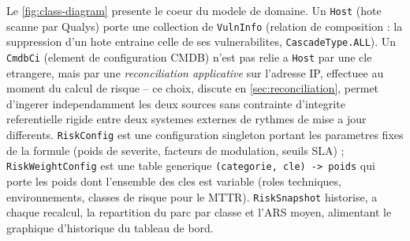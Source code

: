 Le \cref{fig:class-diagram} presente le coeur du modele de domaine. Un \texttt{Host}
(hote scanne par Qualys) porte une collection de \texttt{VulnInfo} (relation de
composition : la suppression d'un hote entraine celle de ses vulnerabilites,
\texttt{CascadeType.ALL}). Un \texttt{CmdbCi} (element de configuration CMDB) n'est
pas relie a \texttt{Host} par une cle etrangere, mais par une \emph{reconciliation
applicative} sur l'adresse IP, effectuee au moment du calcul de risque -- ce choix,
discute en \cref{sec:reconciliation}, permet d'ingerer independamment les deux
sources sans contrainte d'integrite referentielle rigide entre deux systemes
externes de rythmes de mise a jour differents. \texttt{RiskConfig} est une
configuration singleton portant les parametres fixes de la formule (poids de
severite, facteurs de modulation, seuils SLA) ; \texttt{RiskWeightConfig} est une
table generique \texttt{(categorie, cle) -> poids} qui porte les poids dont
l'ensemble des cles est variable (roles techniques, environnements, classes de
risque pour le MTTR). \texttt{RiskSnapshot} historise, a chaque recalcul, la
repartition du parc par classe et l'ARS moyen, alimentant le graphique d'historique
du tableau de bord.

